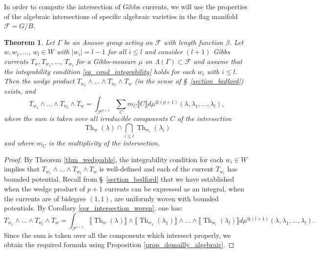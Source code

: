\documentclass[12pt]{amsbook}%
\newtheorem{thm}{Theorem}[chapter]
\theoremstyle{definition}
\theoremstyle{remark}
\numberwithin{section}{chapter}
\numberwithin{subsection}{section}
\numberwithin{figure}{chapter}
\DeclareMathOperator{\Th}{Th}
\newcommand\intcur[1]{\llbracket #1 \rrbracket}
\def\cF{{\mathscr{F}}}
\def\Ga{\Gamma}
\def\La{\Lambda}
\begin{document}
{{In order to compute the intersection of Gibbs currents, we will use the properties of the algebraic intersections of specific algebraic varieties in the flag manifold $\cF = G/B$.  


\begin{thm} \label{thm_intersection_laminar_flag} Let $\Gamma$ be an Anosov group acting on $\cF$ with length function $\beta$. Let $w, w_1, \ldots$, $w_l \in W $ with $|w_i| = l-1$ for all $i \leqslant l$ and consider $(l+1)$ Gibbs currents $T_{w}, T_{w_1}, \ldots$, $T_{w_l}$ for a Gibbs-measure $\mu$ on $\La(\Ga)\subset \cF$ and assume that the integrability condition \eqref{eq_cond_integrability} holds for each $w_i$ with $i\leqslant l$. Then 
the wedge product $T_{w_1} \wedge \ldots \wedge T_{w_l} \wedge T_{w} $ (in the sense of \S~\ref{section_bedford}) exists, 
 and
\begin{equation} \label{eq_geom_intersection}
T_{w_1} \wedge \ldots \wedge T_{w_l} \wedge T_w = \int_{\cF^{p+1}} \sum_{C} m_C \intcur{C}  d\mu^{\otimes (p+1)}(\lambda, \lambda_1 , \ldots, \lambda_l),
\end{equation}
where the sum is taken over all  irreducible components $C$ of the intersection 
$$
\Th_{w}(\lambda)\cap \bigcap_{i\leqslant l} \Th_{w_i}(\lambda_i)$$
 and where $m_C$ is the multiplicity of the intersection. 
\end{thm}

\begin{proof}
By Theorem \ref{thm_wedgeable}, the integrability condition for each $w_i \in W$ implies that $T_{w_1} \wedge \ldots \wedge T_{w_l} \wedge T_w$ is well-defined and each of the current $T_{w_i}$ has bounded potential. 
Recall from \S~\ref{section_bedford} that we have established when the wedge product of $p+1$ currents can be expressed as an integral, when the currents are of bidegree $(1,1)$, are uniformly woven with bounded potentials.  
By Corollary \ref{cor_intersection_woven}, one has: 
\begin{equation}
T_{w_1} \wedge \ldots \wedge T_{w_l} \wedge T_w =  \int_{\cF^{l+1}} \intcur{\Th_{w}(\lambda)} \wedge \intcur{\Th_{w_1}(\lambda_1)} \wedge 
\ldots \wedge \intcur{\Th_{w_l}(\lambda_l)}  d\mu^{\otimes (l+1)}(\lambda, \lambda_1, \ldots, \lambda_l). 
\end{equation}
Since the sum is taken over all the components which intersect properly, we obtain the required formula using Proposition \ref{prop_demailly_algebraic}.
\end{proof}



}}
\end{document}

